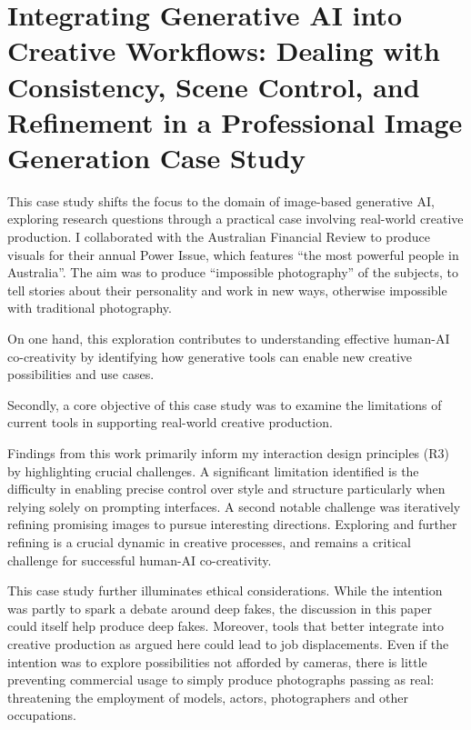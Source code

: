 \chapter[Human-AI Co-Creativity in Visual Production]{Integrating Generative AI into Creative Workflows: Dealing with Consistency, Scene Control, and Refinement in a Professional Image Generation Case Study
} \label{c:tc6} 

This case study shifts the focus to the domain of image-based generative AI, exploring research questions through a practical case involving real-world creative production. I collaborated with the Australian Financial Review to produce visuals for their annual Power Issue, which features “the most powerful people in Australia”. The aim was to produce “impossible photography” of the subjects, to tell stories about their personality and work in new ways, otherwise impossible with traditional photography. 

On one hand, this exploration contributes to understanding effective human-AI co-creativity by identifying how generative tools can enable new creative possibilities and use cases.

Secondly, a core objective of this case study was to examine the limitations of current tools in supporting real-world creative production. 

Findings from this work primarily inform my interaction design principles (R3) by highlighting crucial challenges. A significant limitation identified is the difficulty in enabling precise control over style and structure particularly when relying solely on prompting interfaces. A second notable challenge was iteratively refining promising images to pursue interesting directions. Exploring and further refining is a crucial dynamic in creative processes, and remains a critical challenge for successful human-AI co-creativity. 

This case study further illuminates ethical considerations. While the intention was partly to spark a debate around deep fakes, the discussion in this paper could itself help produce deep fakes. Moreover, tools that better integrate into creative production as argued here could lead to job displacements. Even if the intention was to explore possibilities not afforded by cameras, there is little preventing commercial usage to simply produce photographs passing as real: threatening the employment of models, actors, photographers and other occupations. 




